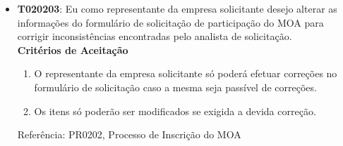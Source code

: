 \begin{itemize}
{\begin{itemize}
{\begin{enumerate}
					\item{Deverá ser disponibilizada a opção de reprovar uma solicitação.}
					\item{Deverá ser disponibilizada a opção de aprovar uma solicitação.}
					\item{Deverá ser disponibilizada a opção para enviar a solicitação para correção.}
				\end{enumerate}
				Referência: PR0202, Processo de Inscrição do MOA}
				\item{\textbf{T020203}: Eu como representante da empresa solicitante desejo alterar as informações do formulário de solicitação de participação do MOA para corrigir inconsistências encontradas pelo analista de solicitação.
				\\ \textbf{Critérios de Aceitação}
				\begin{enumerate}
					\item{O representante da empresa solicitante só poderá efetuar correções no formulário de solicitação caso a mesma seja passível de correções.}
					\item{Os itens só poderão ser modificados se exigida a devida correção.}
				\end{enumerate}
				Referência: PR0202, Processo de Inscrição do MOA}
			\end{itemize}}
	\end{itemize}